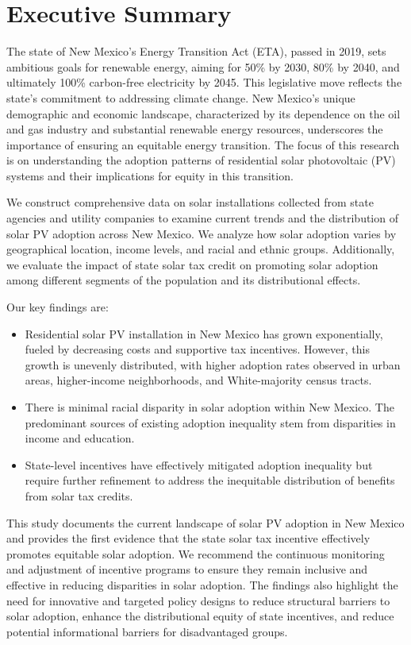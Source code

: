 \documentclass[11pt,twoside,letterpaper]{article}
\begin{document}
\onehalfspacing

\clearpage
\setcounter{page}{1}
\section*{Executive Summary}

The state of New Mexico’s Energy Transition Act (ETA), passed in 2019, sets ambitious goals for renewable energy, aiming for 50\% by 2030, 80\% by 2040, and ultimately 100\% carbon-free electricity by 2045. This legislative move reflects the state’s commitment to addressing climate change. New Mexico’s unique demographic and economic landscape, characterized by its dependence on the oil and gas industry and substantial renewable energy resources, underscores the importance of ensuring an equitable energy transition. The focus of this research is on understanding the adoption patterns of residential solar photovoltaic (PV) systems and their implications for equity in this transition.

We construct comprehensive data on solar installations collected from state agencies and utility companies to examine current trends and the distribution of solar PV adoption across New Mexico. We analyze how solar adoption varies by geographical location, income levels, and racial and ethnic groups. Additionally, we evaluate the impact of state solar tax credit on promoting solar adoption among different segments of the population and its distributional effects.

Our key findings are:
\begin{itemize}
    \item Residential solar PV installation in New Mexico has grown exponentially, fueled by decreasing costs and supportive tax incentives. However, this growth is unevenly distributed, with higher adoption rates observed in urban areas, higher-income neighborhoods, and White-majority census tracts.
    \item There is minimal racial disparity in solar adoption within New Mexico. The predominant sources of existing adoption inequality stem from disparities in income and education.
    \item State-level incentives have effectively mitigated adoption inequality but require further refinement to address the inequitable distribution of benefits from solar tax credits.
\end{itemize}

This study documents the current landscape of solar PV adoption in New Mexico and provides the first evidence that the state solar tax incentive effectively promotes equitable solar adoption. We recommend the continuous monitoring and adjustment of incentive programs to ensure they remain inclusive and effective in reducing disparities in solar adoption. The findings also highlight the need for innovative and targeted policy designs to reduce structural barriers to solar adoption, enhance the distributional equity of state incentives, and reduce potential informational barriers for disadvantaged groups.
\end{document}
